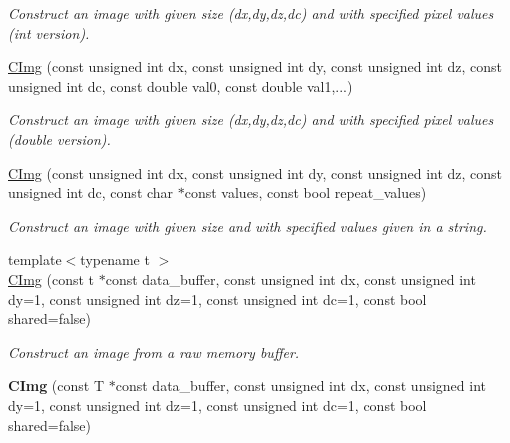 \begin{DoxyCompactItemize}
\begin{DoxyCompactList}\small\item\em Construct an image with given size ({\ttfamily dx},{\ttfamily dy},{\ttfamily dz},{\ttfamily dc}) and with specified pixel values (int version). \item\end{DoxyCompactList}\item 
\hypertarget{structcimg__library_1_1CImg_a2225fbbe3b8b53e3d7749feb951ae570}{
\hyperlink{structcimg__library_1_1CImg_a2225fbbe3b8b53e3d7749feb951ae570}{CImg} (const unsigned int dx, const unsigned int dy, const unsigned int dz, const unsigned int dc, const double val0, const double val1,...)}
\label{structcimg__library_1_1CImg_a2225fbbe3b8b53e3d7749feb951ae570}

\begin{DoxyCompactList}\small\item\em Construct an image with given size ({\ttfamily dx},{\ttfamily dy},{\ttfamily dz},{\ttfamily dc}) and with specified pixel values (double version). \item\end{DoxyCompactList}\item 
\hypertarget{structcimg__library_1_1CImg_ac955e5177f5a4a193c46387338a83201}{
\hyperlink{structcimg__library_1_1CImg_ac955e5177f5a4a193c46387338a83201}{CImg} (const unsigned int dx, const unsigned int dy, const unsigned int dz, const unsigned int dc, const char $\ast$const values, const bool repeat\_\-values)}
\label{structcimg__library_1_1CImg_ac955e5177f5a4a193c46387338a83201}

\begin{DoxyCompactList}\small\item\em Construct an image with given size and with specified values given in a string. \item\end{DoxyCompactList}\item 
{\footnotesize template$<$typename t $>$ }\\\hyperlink{structcimg__library_1_1CImg_aadc5f410b7b8e28d40e72c838f3fd438}{CImg} (const t $\ast$const data\_\-buffer, const unsigned int dx, const unsigned int dy=1, const unsigned int dz=1, const unsigned int dc=1, const bool shared=false)
\begin{DoxyCompactList}\small\item\em Construct an image from a raw memory buffer. \item\end{DoxyCompactList}\item 
\hypertarget{structcimg__library_1_1CImg_a864ac8270ded601d060cee35b414b90a}{
{\bfseries CImg} (const T $\ast$const data\_\-buffer, const unsigned int dx, const unsigned int dy=1, const unsigned int dz=1, const unsigned int dc=1, const bool shared=false)}
\label{structcimg__library_1_1CImg_a864ac8270ded601d060cee35b414b90a}


\end{DoxyCompactItemize}
